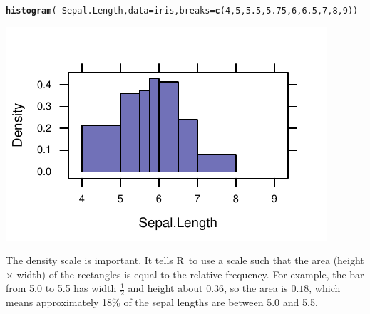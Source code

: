 \documentclass[twoside]{book}\usepackage[]{graphicx}\usepackage[]{xcolor}
\makeatletter
\def\maxwidth{ %
  \ifdim\Gin@nat@width>\linewidth
    \linewidth
  \else
    \Gin@nat@width
  \fi
}
\newcommand{\hlnum}[1]{\textcolor[rgb]{0.686,0.059,0.569}{#1}}%
\newcommand{\hlopt}[1]{\textcolor[rgb]{0,0,0}{#1}}%
\newcommand{\hlstd}[1]{\textcolor[rgb]{0.345,0.345,0.345}{#1}}%
\newcommand{\hlkwc}[1]{\textcolor[rgb]{0.333,0.667,0.333}{#1}}%
\newcommand{\hlkwd}[1]{\textcolor[rgb]{0.737,0.353,0.396}{\textbf{#1}}}%
\newenvironment{kframe}{%
 \def\at@end@of@kframe{}%
 \ifinner\ifhmode%
  \def\at@end@of@kframe{\end{minipage}}%
  \begin{minipage}{\columnwidth}%
 \fi\fi%
 \def\FrameCommand##1{\hskip\@totalleftmargin \hskip-\fboxsep
 \colorbox{shadecolor}{##1}\hskip-\fboxsep
     \hskip-\linewidth \hskip-\@totalleftmargin \hskip\columnwidth}%
 \MakeFramed {\advance\hsize-\width
   \@totalleftmargin\z@ \linewidth\hsize
   \@setminipage}}%
 {\par\unskip\endMakeFramed%
 \at@end@of@kframe}
\newenvironment{knitrout}{}{} %
\def\R{{\sf R}}
\newcounter{example}[section]
\makeatother
\begin{document}
\begin{knitrout}
\color{fgcolor}\begin{kframe}
\begin{alltt}
\hlkwd{histogram}\hlstd{(}\hlopt{~}\hlstd{Sepal.Length,} \hlkwc{data} \hlstd{= iris,} \hlkwc{breaks} \hlstd{=} \hlkwd{c}\hlstd{(}\hlnum{4}\hlstd{,} \hlnum{5}\hlstd{,} \hlnum{5.5}\hlstd{,} \hlnum{5.75}\hlstd{,} \hlnum{6}\hlstd{,} \hlnum{6.5}\hlstd{,} \hlnum{7}\hlstd{,} \hlnum{8}\hlstd{,} \hlnum{9}\hlstd{))}
\end{alltt}
\end{kframe}

{\centering \includegraphics[width=\maxwidth]{figures/fig-hist-unequal-bins-1} 

}



\end{knitrout}
The density scale is important.
It tells \R\ to use a scale such that 
the area (height $\times$ width) of the rectangles is equal to the relative frequency.
For example, the bar from 5.0 to 5.5 has width $\frac12$ and height about $0.36$, so 
the area is $0.18$, which means approximately 18\% of the sepal lengths are 
between 5.0 and 5.5.
\end{document}
